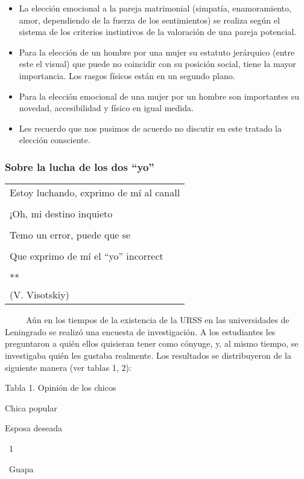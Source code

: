 \begin{itemize}
\tightlist
\item
  La elección emocional a la pareja matrimonial (simpatía,
  enamoramiento, amor, dependiendo de la fuerza de los sentimientos) se
  realiza según el sistema de los criterios instintivos de la valoración
  de una pareja potencial.
\item
  Para la elección de un hombre por una mujer su estatuto jerárquico
  (entre este el visual) que puede no coincidir con su posición social,
  tiene la mayor importancia. Los rasgos físicos están en un segundo
  plano.
\item
  Para la elección emocional de una mujer por un hombre son importantes
  su novedad, accesibilidad y físico en igual medida.
\item
  Les recuerdo que nos pusimos de acuerdo no discutir en este tratado la
  elección consciente.
\end{itemize}

\protect\hypertarget{M11}{}{}

\hypertarget{sobre-la-lucha-de-los-dos-yo}{\subsubsection{\texorpdfstring{Sobre
la lucha de los dos
``yo''}{Sobre la lucha de los dos yo}}\label{sobre-la-lucha-de-los-dos-yo}}

\begin{longtable}[]{@{}l@{}}
\toprule
Estoy luchando, exprimo de mí al canall\tabularnewline
\tabularnewline
¡Oh, mi destino inquieto\tabularnewline
\tabularnewline
Temo un error, puede que se\tabularnewline
\tabularnewline
Que exprimo de mí el ``yo'' incorrect\tabularnewline
\tabularnewline
**\tabularnewline
(V. Visotskiy)\tabularnewline
\bottomrule
\end{longtable}

~ ~ ~ Aún en los tiempos de la existencia de la URSS en las
universidades de Leningrado se realizó una encuesta de investigación. A
los estudiantes les preguntaron a quién ellos quisieran tener como
cónyuge, y, al mismo tiempo, se investigaba quién les gustaba realmente.
Los resultados se distribuyeron de la siguiente manera (ver tablas 1,
2):

Tabla 1. Opinión de los chicos

Chica popular

Esposa deseada

~1

~Guapa

